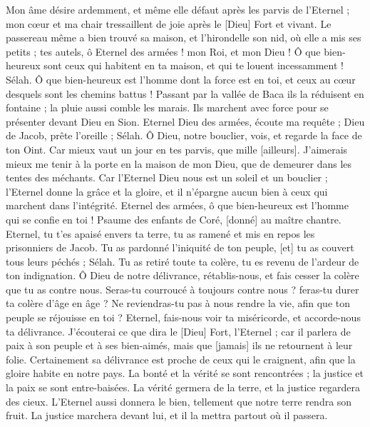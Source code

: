 \begin{multicols}{2}
Mon âme désire ardemment, et même elle défaut après les parvis de l'Eternel ; mon cœur et ma chair tressaillent de joie après le [Dieu] Fort et vivant.
Le passereau même a bien trouvé sa maison, et l'hirondelle son nid, où elle a mis ses petits ; tes autels, ô Eternel des armées ! mon Roi, et mon Dieu !
Ô que bien-heureux sont ceux qui habitent en ta maison, et qui te louent incessamment ! Sélah.
Ô que bien-heureux est l'homme dont la force est en toi, et ceux au cœur desquels sont les chemins battus !
Passant par la vallée de Baca ils la réduisent en fontaine ; la pluie aussi comble les marais.
Ils marchent avec force pour se présenter devant Dieu en Sion.
Eternel Dieu des armées, écoute ma requête ; Dieu de Jacob, prête l'oreille ; Sélah.
Ô Dieu, notre bouclier, vois, et regarde la face de ton Oint.
Car mieux vaut un jour en tes parvis, que mille [ailleurs]. J'aimerais mieux me tenir à la porte en la maison de mon Dieu, que de demeurer dans les tentes des méchants.
Car l'Eternel Dieu nous est un soleil et un bouclier ; l'Eternel donne la grâce et la gloire, et il n'épargne aucun bien à ceux qui marchent dans l'intégrité.
Eternel des armées, ô que bien-heureux est l'homme qui se confie en toi !
\VerseOne{}Psaume des enfants de Coré, [donné] au maître chantre. Eternel, tu t'es apaisé envers ta terre, tu as ramené et mis en repos les prisonniers de Jacob.
Tu as pardonné l'iniquité de ton peuple, [et] tu as couvert tous leurs péchés ; Sélah.
Tu as retiré toute ta colère, tu es revenu de l'ardeur de ton indignation.
Ô Dieu de notre délivrance, rétablis-nous, et fais cesser la colère que tu as contre nous.
Seras-tu courroucé à toujours contre nous ? feras-tu durer ta colère d'âge en âge ?
Ne reviendras-tu pas à nous rendre la vie, afin que ton peuple se réjouisse en toi ?
Eternel, fais-nous voir ta miséricorde, et accorde-nous ta délivrance.
J'écouterai ce que dira le [Dieu] Fort, l'Eternel ; car il parlera de paix à son peuple et à ses bien-aimés, mais que [jamais] ils ne retournent à leur folie.
Certainement sa délivrance est proche de ceux qui le craignent, afin que la gloire habite en notre pays.
La bonté et la vérité se sont rencontrées ; la justice et la paix se sont entre-baisées.
La vérité germera de la terre, et la justice regardera des cieux.
L'Eternel aussi donnera le bien, tellement que notre terre rendra son fruit.
La justice marchera devant lui, et il la mettra partout où il passera.

\end{multicols}
